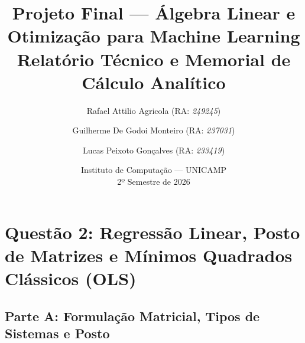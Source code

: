 \documentclass[11pt,a4paper]{article}
\title{\textbf{Projeto Final — Álgebra Linear e Otimização para Machine Learning}\\
\large Relatório Técnico e Memorial de Cálculo Analítico}
\author{
Rafael Attilio Agricola (RA: \textit{249245}) \and
Guilherme De Godoi Monteiro (RA: \textit{237031}) \and
Lucas Peixoto Gonçalves (RA: \textit{233419})
}
\date{Instituto de Computação — UNICAMP \\ 2º Semestre de 2026}
\begin{document}
\maketitle

\setcounter{section}{1}
\section{Questão 2: Regressão Linear, Posto de Matrizes e Mínimos Quadrados Clássicos (OLS)}

\subsection{Parte A: Formulação Matricial, Tipos de Sistemas e Posto}
\end{document}
